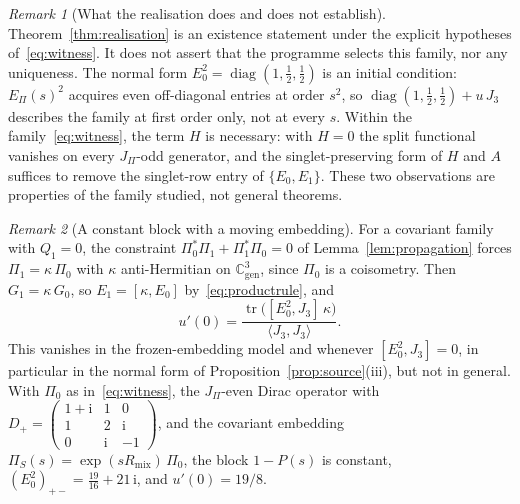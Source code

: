 \documentclass[11pt]{article}
\theoremstyle{definition}
\theoremstyle{remark}
\newtheorem{remark}{Remark}
\newcommand{\JPi}{J_{\Pi}}
\newcommand{\Jthree}{J_{3}}
\newcommand{\Rmix}{R_{\mathrm{mix}}}
\newcommand{\Cgen}{\mathbb{C}^{3}_{\mathrm{gen}}}
\newcommand{\Epi}{E_{\Pi}}
\newcommand{\PiS}{\Pi_{S}}
\newcommand{\tr}{\operatorname{tr}}
\newcommand{\diag}{\operatorname{diag}}
\begin{document}
    \begin{remark}[What the realisation does and does not establish]
      \label{rem:realisation}
      Theorem~\ref{thm:realisation} is an existence statement under the explicit hypotheses of~\eqref{eq:witness}.
      It does not assert that the programme selects this family, nor any uniqueness.
      The normal form $E_0^2 = \diag(1, \tfrac12, \tfrac12)$ is an initial condition: $\Epi(s)^2$ acquires even
      off-diagonal entries at order $s^2$, so $\diag(1, \tfrac12, \tfrac12) + u\,\Jthree$ describes the family at first
    order only, not at every $s$.
      Within the family~\eqref{eq:witness}, the term $H$ is necessary: with $H = 0$ the split functional vanishes on
      every
      $\JPi$-odd generator, and the singlet-preserving form of $H$ and $A$ suffices to remove the singlet-row entry of
      $\{E_0, E_1\}$.
      These two observations are properties of the family studied, not general theorems.
    \end{remark}

    \begin{remark}[A constant block with a moving embedding]
      \label{rem:constant-block}
      For a covariant family with $Q_1 = 0$, the constraint $\Pi_0^{*}\Pi_1 + \Pi_1^{*}\Pi_0 = 0$ of
      Lemma~\ref{lem:propagation} forces $\Pi_1 = \kappa\,\Pi_0$ with $\kappa$ anti-Hermitian on $\Cgen$, since $\Pi_0$
      is a coisometry.
      Then $G_1 = \kappa\,G_0$, so $E_1 = [\kappa, E_0]$ by~\eqref{eq:productrule}, and
      \begin{equation}
        \label{eq:constantblock}
        u'(0) = \frac{\tr\bigl([E_0^2, \Jthree]\,\kappa\bigr)}{\langle \Jthree, \Jthree\rangle}.
      \end{equation}
      This vanishes in the frozen-embedding model and whenever $[E_0^2, \Jthree] = 0$, in particular in the normal form
      of Proposition~\ref{prop:source}(iii), but not in general.
      With $\Pi_0$ as in~\eqref{eq:witness}, the $\JPi$-even Dirac operator with
      $D_+ = \left(\begin{smallmatrix} 1+\mathrm{i} & 1 & 0 \\ 1 & 2 & \mathrm{i} \\ 0 & \mathrm{i} & -1
      \end{smallmatrix}\right)$, and the covariant embedding $\PiS(s) = \exp(s\Rmix)\,\Pi_0$, the block $1-P(s)$ is
      constant, $(E_0^2)_{+-} = \tfrac{19}{16} + 21\,\mathrm{i}$, and $u'(0) = 19/8$.
    \end{remark}
\end{document}

